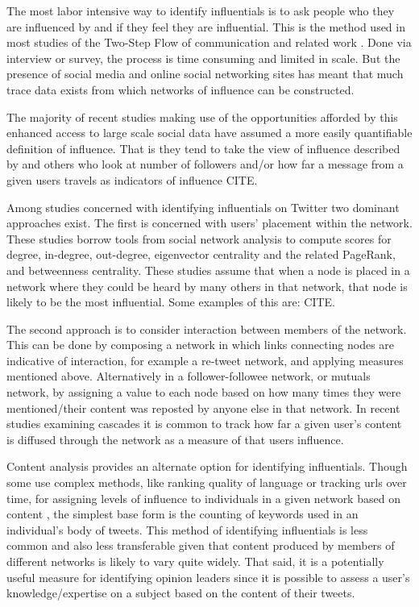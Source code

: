 \documentclass[a4paper,12pt]{article}
\begin{document}
The most labor intensive way to identify influentials is to ask people who they are influenced by and if they feel they are influential. This is the method used in most studies of the Two-Step Flow of communication and related work \cite{katz}. Done via interview or survey, the process is time consuming and limited in scale. But the presence of social media and online social networking sites has meant that much trace data exists from which networks of influence can be constructed.

The majority of recent studies making use of the opportunities afforded by this enhanced access to large scale social data have assumed a more easily quantifiable definition of influence. That is they tend to take the view of influence described by \cite{rogers4th} and others who look at number of followers and/or how far a message from a given users travels as indicators of influence CITE. 

Among studies concerned with identifying influentials on Twitter two dominant approaches exist. The first is concerned with users' placement within the network. These studies borrow tools from social network analysis to compute scores for degree, in-degree, out-degree, eigenvector centrality and the related PageRank, and betweenness centrality. These studies assume that when a node is placed in a network where they could be heard by many others in that network, that node is likely to be the most influential. Some examples of this are: CITE.

The second approach is to consider interaction between members of the network. This can be done by composing a network in which links connecting nodes are indicative of interaction, for example a re-tweet network, and applying measures mentioned above. Alternatively in a follower-followee network, or mutuals network, by assigning a value to each node based on how many times they were mentioned/their content was reposted by anyone else in that network. In recent studies examining cascades it is common to track how far a given user's content is diffused through the network as a measure of that users influence. 

Content analysis provides an alternate option for identifying influentials. Though some use complex methods, like ranking quality of language or tracking urls over time, for assigning levels of influence to individuals in a given network based on content \cite{Bakshy, sharawneh2013, Ye2010}, the simplest base form is the counting of keywords used in an individual's body of tweets. This method of identifying influentials is less common and also less transferable given that content produced by members of different networks is likely to vary quite widely. That said, it is a potentially useful measure for identifying opinion leaders since it is possible to assess a user's knowledge/expertise on a subject based on the content of their tweets.
\end{document}
